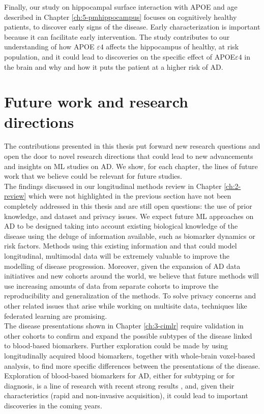 Finally, our study on hippocampal surface interaction with APOE and age described in Chapter \ref{ch:5-pmhippocampus} focuses on cognitively healthy patients, to discover early signs of the disease. Early characterization is important because it can facilitate early intervention. The study contributes to our understanding of how APOE $\varepsilon4$ affects the hippocampus of healthy, at risk population, and it could lead to discoveries on the specific effect of APOE$\varepsilon4$ in the brain and why and how it puts the patient at a higher risk of AD.

\section{Future work and research directions}

The contributions presented in this thesis put forward new research questions and open the door to novel research directions that could lead to new advancements and insights on ML studies on AD. We show, for each chapter, the lines of future work that we believe could be relevant for future studies. \\

The findings discussed in our longitudinal methods review in Chapter \ref{ch:2-review} which were not highlighted in the previous section have not been completely addressed in this thesis and are still open questions: the use of prior knowledge, and dataset and privacy issues. We expect future ML approaches on AD to be designed taking into account existing biological knowledge of the disease using the deluge of information available, such as biomarker dynamics or risk factors. Methods using this existing information and that could model longitudinal, multimodal data will be extremely valuable to improve the modelling of disease progression. Moreover, given the expansion of AD data initiatives and new cohorts around the world, we believe that future methods will use increasing amounts of data from separate cohorts to improve the reproducibility and generalization of the methods. To solve privacy concerns and other related issues that arise while working on multisite data, techniques like federated learning \cite{Yang2019} are promising.\\

The disease presentations shown in Chapter \ref{ch:3-cimlr} require validation in other cohorts to confirm and expand the possible subtypes of the disease linked to blood-based biomarkers. Further exploration could be made by using longitudinally acquired blood biomarkers, together with whole-brain voxel-based analysis, to find more specific differences between the presentations of the disease. Exploration of blood-based biomarkers for AD, either for subtyping or for diagnosis, is a line of research with recent strong results \cite{Cullen2020,Moscoso2020}, and, given their characteristics (rapid and non-invasive acquisition), it could lead to important discoveries in the coming years. \\

